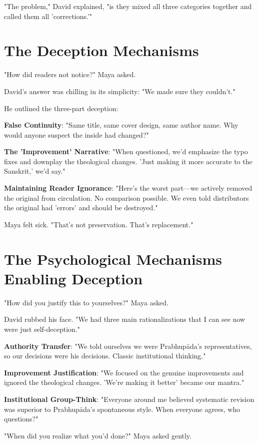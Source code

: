 \documentclass[11pt,twoside]{book}
\begin{document}
"The problem," David explained, "is they mixed all three categories together and called them all 'corrections.'"
\section*{The Deception Mechanisms}
\label{sec:org1573d47}

"How did readers not notice?" Maya asked.

David's answer was chilling in its simplicity: "We made sure they couldn't."

He outlined the three-part deception:

\textbf{\textbf{False Continuity}}: "Same title, same cover design, same author name. Why would anyone suspect the inside had changed?"

\textbf{\textbf{The 'Improvement' Narrative}}: "When questioned, we'd emphasize the typo fixes and downplay the theological changes. 'Just making it more accurate to the Sanskrit,' we'd say."

\textbf{\textbf{Maintaining Reader Ignorance}}: "Here's the worst part—we actively removed the original from circulation. No comparison possible. We even told distributors the original had 'errors' and should be destroyed."

Maya felt sick. "That's not preservation. That's replacement."
\section*{The Psychological Mechanisms Enabling Deception}
\label{sec:orgc279232}

"How did you justify this to yourselves?" Maya asked.

David rubbed his face. "We had three main rationalizations that I can see now were just self-deception."

\textbf{\textbf{Authority Transfer}}: "We told ourselves we were Prabhupāda's representatives, so our decisions were his decisions. Classic institutional thinking."

\textbf{\textbf{Improvement Justification}}: "We focused on the genuine improvements and ignored the theological changes. 'We're making it better' became our mantra."

\textbf{\textbf{Institutional Group-Think}}: "Everyone around me believed systematic revision was superior to Prabhupāda's spontaneous style. When everyone agrees, who questions?"

"When did you realize what you'd done?" Maya asked gently.
\end{document}
